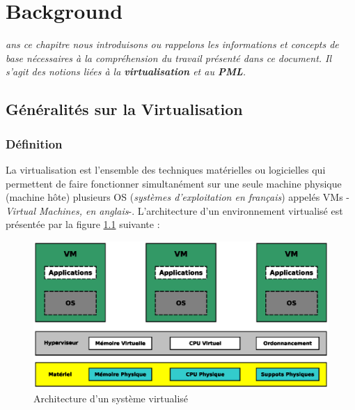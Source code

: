 \let\textcircled=\pgftextcircled
\chapter{Background}
\label{chap:background}

\textit{ans ce chapitre nous introduisons ou rappelons les informations et concepts de base nécessaires à la compréhension du travail présenté dans ce document. Il s'agit des notions liées à la \textbf{virtualisation} et au \textbf{PML}.}

\minitoc

\newpage    
\section{Généralités sur la Virtualisation}

\subsection{Définition}
\par\noindent La virtualisation est l’ensemble des techniques matérielles ou logicielles qui permettent de faire fonctionner simultanément sur une seule machine physique (machine hôte) plusieurs \ac{OS} (\textit{systèmes d’exploitation en français}) appelés \ac{VMs} -\textit{Virtual Machines, en anglais}-. L'architecture d'un environnement virtualisé est présentée par la figure \ref{fig:environnement_virtualise} suivante :\\

\begin{figure}[H]
    \centering
    \includegraphics[scale=.8]{chapters/1/fig1/environnement_virtualise}
    \caption{Architecture d'un système virtualisé}
    \label{fig:environnement_virtualise}
\end{figure}

